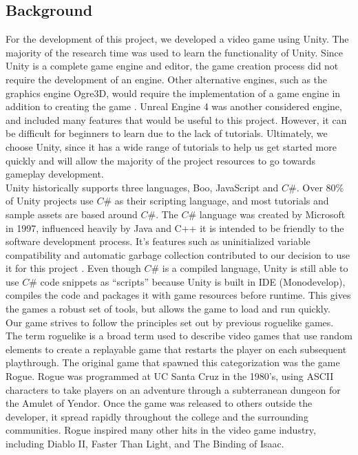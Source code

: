 \documentclass[12pt]{article}       %
\def\hs{\hspace{15pt}}
\begin{document}
\subsection{Background}
	\hs For the development of this project, we developed a video game using Unity. The majority of the research time was used to learn the functionality of Unity. Since Unity is a complete game engine and editor, the game creation process did not require the development of an engine. Other alternative engines, such as the graphics engine Ogre3D, would require the implementation of a game engine in addition to creating the game \cite{Ogre}. Unreal Engine 4 was another considered engine, and included many features that would be useful to this project. However, it can be difficult for beginners to learn due to the lack of tutorials. Ultimately, we choose Unity, since it has a wide range of tutorials to help us get started more quickly and will allow the majority of the project resources to go towards gameplay development. \\

        Unity historically supports three languages, Boo, JavaScript and $C\#$.  Over 80\% of Unity projects use $C\#$ as their scripting language, and most tutorials and sample assets are based around $C\#$. \cite{blog} The $C\#$ language was created by Microsoft in 1997, influenced heavily by Java and C++ it is intended to be friendly to the software development process. It’s features such as uninitialized variable compatibility and automatic garbage collection contributed to our decision to use it for this project \cite{Cadet}. Even though $C\#$ is a compiled language, Unity is still able to use $C\#$ code snippets as “scripts” because Unity is built in IDE (Monodevelop), compiles the code and packages it with game resources before runtime. This gives the games a robust set of tools, but allows the game to load and run quickly. \cite{Moles} \\

	Our game strives to follow the principles set out by previous roguelike games. The term roguelike is a broad term used to describe video games that use random elements to create a replayable game that restarts the player on each subsequent playthrough. The original game that spawned this categorization was the game Rogue. Rogue was programmed at UC Santa Cruz in the 1980’s, using ASCII characters to take players on an adventure through a subterranean dungeon for the Amulet of Yendor. Once the game was released to others outside the developer, it spread rapidly throughout the college and the surrounding communities. Rogue inspired many other hits in the video game industry, including Diablo II, Faster Than Light, and The Binding of Isaac. \cite{Rogue} \\
\end{document}

